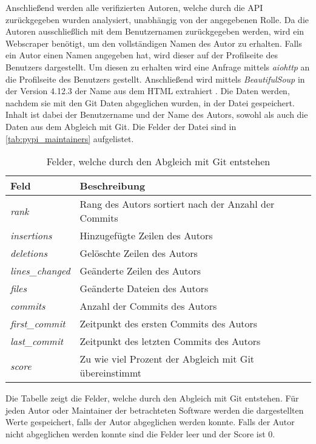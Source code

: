 Anschließend werden alle verifizierten Autoren, welche durch die API zurückgegeben wurden analysiert, unabhängig von der angegebenen Rolle.
Da die Autoren ausschließlich mit dem Benutzernamen zurückgegeben werden, wird ein Webscraper benötigt, um den vollständigen Namen des Autor zu erhalten.
Falls ein Autor einen Namen angegeben hat, wird dieser auf der Profilseite des Benutzers dargestellt.
Um diesen zu erhalten wird eine Anfrage mittels \emph{aiohttp} an die Profilseite des Benutzers gestellt.
Anschließend wird mittels \emph{BeautifulSoup} in der Version 4.12.3 der Name aus dem HTML extrahiert \autocite{richardson_beautifulsoup4_2024}.
Die Daten werden, nachdem sie mit den Git Daten abgeglichen wurden, in der Datei  gespeichert.
Inhalt ist dabei der Benutzername und der Name des Autors, sowohl als auch die Daten aus dem Abgleich mit Git.
Die Felder der Datei sind in \autoref{tab:pypi_maintainers} aufgelistet.

\begin{table}
    \centering
    \setlength{\tabcolsep}{8pt}
    \begin{tabular}{p{3.5cm}|p{10cm}}
        \toprule
        \textbf{Feld} & \textbf{Beschreibung} \\ \midrule
        \emph{rank} & Rang des Autors sortiert nach der Anzahl der Commits \\
        \emph{insertions} & Hinzugefügte Zeilen des Autors \\
        \emph{deletions} & Gelöschte Zeilen des Autors \\
        \emph{lines\_changed} & Geänderte Zeilen des Autors \\
        \emph{files} & Geänderte Dateien des Autors \\
        \emph{commits} & Anzahl der Commits des Autors \\
        \emph{first\_commit} & Zeitpunkt des ersten Commits des Autors \\
        \emph{last\_commit} & Zeitpunkt des letzten Commits des Autors \\
        \emph{score} & Zu wie viel Prozent der Abgleich mit Git übereinstimmt \\
        \bottomrule
    \end{tabular}
    \caption{Felder, welche durch den Abgleich mit Git entstehen}
    \label{tab:abgleich_felder}
    \small
    Die Tabelle zeigt die Felder, welche durch den Abgleich mit Git entstehen. Für jeden Autor oder Maintainer der betrachteten Software werden die dargestellten Werte gespeichert, falls der Autor abgeglichen werden konnte. Falls der Autor nicht abgeglichen werden konnte sind die Felder leer und der Score ist 0.
\end{table}

